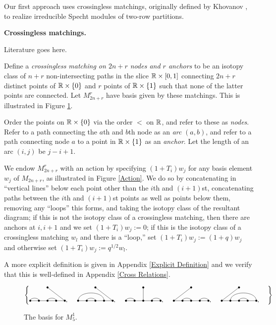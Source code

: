 \documentclass{amsart}
\newcommand{\fakesubsection}[1]{
    \vspace{7pt}
    \noindent \textbf{#1.}
  }
\begin{document}
  Our first approach uses crossingless matchings, originally defined by Khovanov \cite{Khovanov}, to realize irreducible Specht modules of two-row partitions.

  \fakesubsection{Crossingless matchings}
  {\color{orange} Literature goes here.}

  \begin{definition}
  Define a \emph{crossingless matching on $2n + r$ nodes and $r$ anchors} to be an isotopy class of $n + r$ non-intersecting paths in the slice $\mathbb{R} \times \left[ 0,1 \right]$ connecting $2n + r$ distinct points of $\mathbb{R} \times \left\{ 0 \right\}$ and $r$ points of $\mathbb{R} \times \left\{ 1 \right\}$ such that none of the latter points are connected. 
  Let $M_{2n + r}^r$ have basis given by these matchings.
  This is illustrated in Figure \ref{S5 Basis}.
 
  Order the points on $\mathbb{R} \times \left\{ 0 \right\}$ via the order $<$ on $\mathbb{R}$, and refer to these as \emph{nodes}.
  Refer to a path connecting the $a$th and $b$th node as an \emph{arc} $(a,b)$, and refer to a path connecting node $a$ to a point in $\mathbb{R} \times \left\{ 1 \right\}$ as an \emph{anchor}.
  Let the length of an arc $(i,j)$ be $j - i + 1$.


  We endow $M_{2n + r}^r$ with an action by specifying $(1 + T_i)w_j$ for any basis element $w_j$ of $M_{2n + r}$, as illustrated in Figure \ref{Action}.
  We do so by concatenating in ``vertical lines'' below each point other than the $i$th and $(i+1)$st, concatenating paths between the $i$th and $(i+1)$st points as well as points below them, removing any ``loops'' this forms, and taking the isotopy class of the resultant diagram;
  if this is not the isotopy class of a crossingless matching, then there are anchors at $i,i+1$ and we set $(1 + T_i)w_j := 0$;
  if this is the isotopy class of a crossingless matching $w_l$ and there is a ``loop,'' set $(1 + T_i)w_j := (1 + q)w_j$ and otherwise set $(1 + T_i)w_j := q^{1/2}w_l$.
  
  A more explicit definition is given in Appendix \ref{Explicit Definition} and we verify that this is well-defined in Appendix \ref{Cross Relations}.
  \end{definition}
  \begin{figure} 
    \def\cbasisspacing{5mm}
    \begin{adjustbox}{width=\textwidth}
    $\cbr{
      \begin{gathered}
        \GeneralizedMatching{5}{1/2, 3/4}{1}{5/1}{3/4}, \hspace{\cbasisspacing}
        \GeneralizedMatching{5}{1/4, 2/3}{1}{5/1}{3/4}, \hspace{\cbasisspacing}
        \GeneralizedMatching{5}{1/2, 4/5}{1}{3/1}{3/4}, \hspace{\cbasisspacing}
        \GeneralizedMatching{5}{2/3, 4/5}{1}{1/1}{3/4}, \hspace{\cbasisspacing}
        \GeneralizedMatching{5}{2/5, 3/4}{1}{1/1}{3/4}, \hspace{\cbasisspacing}
       \end{gathered}}$ 
     \end{adjustbox}
       \caption{The basis for $M_5^1$.}
    \label{S5 Basis}
   \end{figure} 
\end{document}
